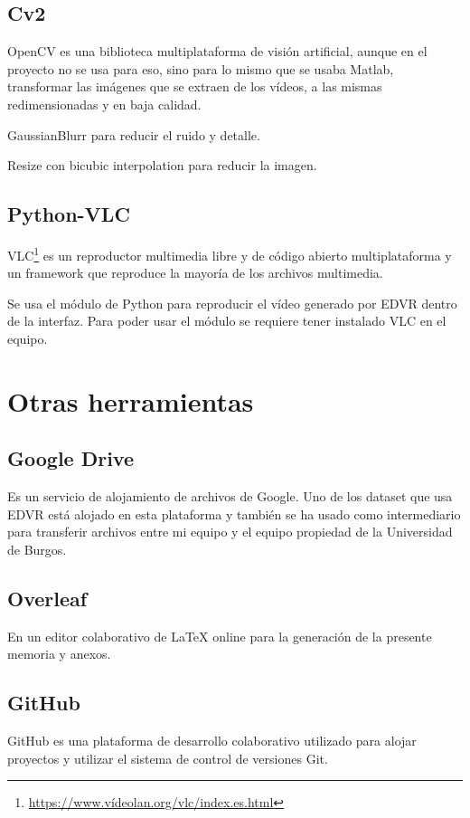     \subsection{Cv2}
    OpenCV es una biblioteca multiplataforma de visión artificial, aunque en el proyecto no se usa para eso, sino para lo mismo que se usaba Matlab, transformar las imágenes que se extraen de los vídeos, a las mismas redimensionadas y en baja calidad.
    
    GaussianBlurr para reducir el ruido y detalle.
    
    Resize con bicubic interpolation para reducir la imagen. 

    \subsection{Python-VLC}
    VLC\footnote{\url{https://www.vídeolan.org/vlc/index.es.html}} es un reproductor multimedia libre y de código abierto multiplataforma y un framework que reproduce la mayoría de los archivos multimedia.
    
    Se usa el módulo de Python para reproducir el vídeo generado por EDVR dentro de la interfaz. Para poder usar el módulo se requiere tener instalado VLC en el equipo.


\section{Otras herramientas}

    \subsection{Google Drive}
    Es un servicio de alojamiento de archivos de Google. Uno de los dataset que usa EDVR está alojado en esta plataforma  y también se ha usado como intermediario para transferir archivos entre mi equipo y el equipo propiedad de la Universidad de Burgos.
    
    \subsection{Overleaf}
    En un  editor colaborativo de \LaTeX{} online para la generación de la presente memoria y anexos.
    
    \subsection{GitHub}    
    GitHub es una plataforma de desarrollo colaborativo utilizado para alojar proyectos y utilizar el sistema de control de versiones Git.


